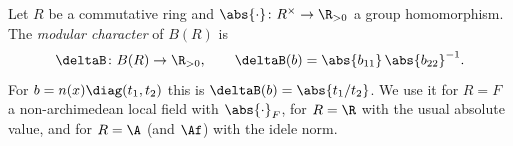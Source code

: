 Let $R$ be a commutative ring and $\abs{\cdot}\colon R^\times\to\R_{>0}$ a group homomorphism. The \emph{modular
character} of $B(R)$ is
\[
  \deltaB\colon B(R)\to\R_{>0},\qquad\deltaB(b)=\abs{b_{11}}\,\abs{b_{22}}^{-1}.
\]
For $b=n(x)\diag(t_1,t_2)$ this is $\deltaB(b)=\abs{t_1/t_2}$. We use it for $R=F$ a non-archimedean local field with
$\abs{\cdot}_F$, for $R=\R$ with the usual absolute value, and for $R=\A$ (and $\Af$) with the idele norm.
